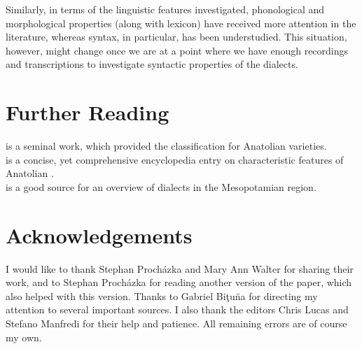 \documentclass[output=paper]{langsci/langscibook}
\begin{document}
Similarly, in terms of the linguistic features investigated, phonological and morphological properties (along with lexicon) have received more attention in the literature, whereas syntax, in particular, has been understudied. This situation, however, might change once we are at a point where we have enough recordings and transcriptions to investigate syntactic properties of the dialects.

\section*{Further Reading}

\citet{Jastrow1978} is a seminal work, which provided the classification for Anatolian  varieties. \\
\citet{Jastrow2011anatolian} is a concise, yet comprehensive encyclopedia entry on characteristic features of Anatolian .\\
\noindent \citet{Talay2011} is a good source for an overview of  dialects in the Meso\-potamian region.

\section*{Acknowledgements}
I would like to thank Stephan Proch\'{a}zka and Mary Ann Walter for sharing their work, and to Stephan Proch\'{a}zka for reading another version of the paper, which also helped with this version. Thanks to Gabriel Bi\c{t}u\u{n}a for directing my attention to several important sources. I also thank the editors Chris Lucas and Stefano Manfredi for their help and patience. All remaining errors are of course my own.
\end{document}
